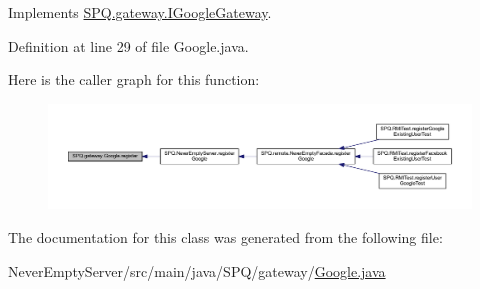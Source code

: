 Implements \mbox{\hyperlink{interface_s_p_q_1_1gateway_1_1_i_google_gateway_a35bfcf888bfbf45ab05f33c89348052a}{S\+P\+Q.\+gateway.\+I\+Google\+Gateway}}.



Definition at line 29 of file Google.\+java.

Here is the caller graph for this function\+:\nopagebreak
\begin{figure}[H]
\begin{center}
\leavevmode
\includegraphics[width=350pt]{class_s_p_q_1_1gateway_1_1_google_ab287ce4fd789224c45be6037a99a937b_icgraph}
\end{center}
\end{figure}


The documentation for this class was generated from the following file\+:\begin{DoxyCompactItemize}
\item 
Never\+Empty\+Server/src/main/java/\+S\+P\+Q/gateway/\mbox{\hyperlink{_google_8java}{Google.\+java}}\end{DoxyCompactItemize}
